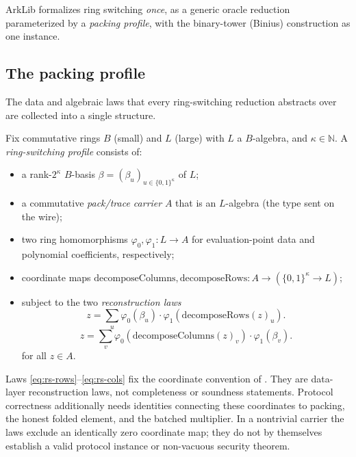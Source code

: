 ArkLib formalizes ring switching \emph{once}, as a generic oracle reduction parameterized by a
\emph{packing profile}, with the binary-tower (Binius) construction as one instance.

\subsection{The packing profile}

The data and algebraic laws that every ring-switching reduction abstracts over are collected into a
single structure.

\begin{definition}
  \label{def:ring_switching_profile}
  Fix commutative rings $B$ (small) and $L$ (large) with $L$ a $B$-algebra, and $\kappa \in
  \mathbb{N}$. A \emph{ring-switching profile} consists of:
  \begin{itemize}
    \item a rank-$2^\kappa$ $B$-basis $\beta = (\beta_u)_{u \in \{0,1\}^\kappa}$ of $L$;
    \item a commutative \emph{pack/trace carrier} $A$ that is an $L$-algebra (the type sent on the
      wire);
    \item two ring homomorphisms $\varphi_0, \varphi_1 : L \to A$ for evaluation-point data and
      polynomial coefficients, respectively;
    \item coordinate maps $\mathrm{decomposeColumns}, \mathrm{decomposeRows} : A \to (\{0,1\}^\kappa
      \to L)$;
    \item subject to the two \emph{reconstruction laws}
      \begin{equation}
        z = \sum_{u} \varphi_0(\beta_u)\cdot \varphi_1(\mathrm{decomposeRows}(z)_u).
        \label{eq:rs-rows}
      \end{equation}
      \begin{equation}
        z = \sum_{v} \varphi_0(\mathrm{decomposeColumns}(z)_v)\cdot \varphi_1(\beta_v).
        \label{eq:rs-cols}
      \end{equation}
      for all $z \in A$.
  \end{itemize}
\end{definition}

Laws \eqref{eq:rs-rows}--\eqref{eq:rs-cols} fix the coordinate convention of
\cite[\S2.5]{DP24}. They are data-layer reconstruction laws, not completeness or soundness
statements. Protocol correctness additionally needs identities connecting these coordinates to
packing, the honest folded element, and the batched multiplier. In a nontrivial carrier the laws
exclude an identically zero coordinate map; they do not by themselves establish a valid protocol
instance or non-vacuous security theorem.

